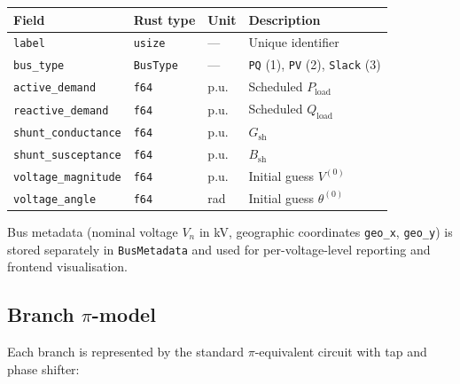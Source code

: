 \documentclass[11pt,a4paper]{article}
\begin{document}
\begin{center}
\small
\begin{tabular}{llll}
  \toprule
  \textbf{Field} & \textbf{Rust type} & \textbf{Unit} & \textbf{Description} \\
  \midrule
  \texttt{label}             & \texttt{usize} & --- & Unique identifier \\
  \texttt{bus\_type}          & \texttt{BusType} & --- &
    \texttt{PQ} (1), \texttt{PV} (2), \texttt{Slack} (3) \\
  \texttt{active\_demand}     & \texttt{f64}   & p.u. & Scheduled $P_\text{load}$ \\
  \texttt{reactive\_demand}   & \texttt{f64}   & p.u. & Scheduled $Q_\text{load}$ \\
  \texttt{shunt\_conductance} & \texttt{f64}   & p.u. & $G_\text{sh}$ \\
  \texttt{shunt\_susceptance} & \texttt{f64}   & p.u. & $B_\text{sh}$ \\
  \texttt{voltage\_magnitude} & \texttt{f64}   & p.u. & Initial guess $V^{(0)}$ \\
  \texttt{voltage\_angle}     & \texttt{f64}   & rad  & Initial guess $\theta^{(0)}$ \\
  \bottomrule
\end{tabular}
\end{center}

\noindent
Bus metadata (nominal voltage $V_n$ in kV, geographic coordinates
\texttt{geo\_x}, \texttt{geo\_y}) is stored separately in
\texttt{BusMetadata} and used for per-voltage-level reporting and
frontend visualisation.

\subsection{Branch $\pi$-model}\label{sec:pi}

Each branch is represented by the standard $\pi$-equivalent circuit with
tap and phase shifter:
\end{document}
